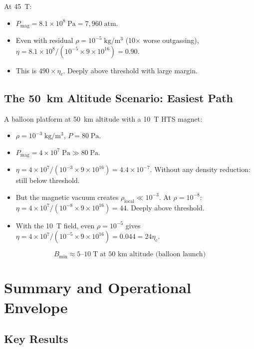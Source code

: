 \documentclass[11pt,a4paper]{article}
\begin{document}
At 45~T:
\begin{itemize}
\item $P_{\mathrm{mag}} = 8.1 \times 10^8\;\mathrm{Pa} = 7{,}960\;\mathrm{atm}$.
\item Even with residual $\rho = 10^{-5}\;\mathrm{kg/m^3}$ (10$\times$ worse
outgassing), $\eta = 8.1 \times 10^8 / (10^{-5} \times 9 \times 10^{16}) = 0.90$.
\item This is $490 \times \eta_c$. Deeply above threshold with large margin.
\end{itemize}

\subsection{The 50~km Altitude Scenario: Easiest Path}

A balloon platform at 50~km altitude with a 10~T HTS magnet:
\begin{itemize}
\item $\rho = 10^{-3}\;\mathrm{kg/m^3}$, $P = 80\;\mathrm{Pa}$.
\item $P_{\mathrm{mag}} = 4 \times 10^7\;\mathrm{Pa} \gg 80\;\mathrm{Pa}$.
\item $\eta = 4 \times 10^7 / (10^{-3} \times 9 \times 10^{16}) = 4.4 \times 10^{-7}$.
Without any density reduction: still below threshold.
\item But the magnetic vacuum creates $\rho_{\mathrm{local}} \ll 10^{-3}$.
At $\rho = 10^{-8}$: $\eta = 4 \times 10^7/(10^{-8} \times 9 \times 10^{16}) = 44$.
Deeply above threshold.
\item With the 10~T field, even $\rho = 10^{-5}$ gives
$\eta = 4 \times 10^7/(10^{-5} \times 9 \times 10^{16}) = 0.044 = 24\eta_c$.
\end{itemize}

\begin{equation}
\boxed{B_{\mathrm{min}} \approx 5\text{--}10\;\mathrm{T}
\;\text{at 50~km altitude (balloon launch)}}
\end{equation}

\section{Summary and Operational Envelope}\label{sec:summary}

\subsection{Key Results}
\end{document}
